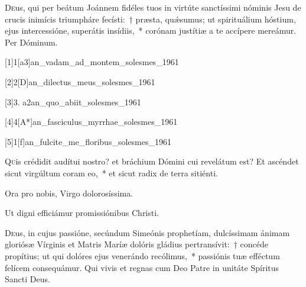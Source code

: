 \documentclass[vesperale_romanum.tex]{subfiles}
\begin{document}
\lettrine{D}{e}us, qui per beátum Joánnem fidéles tuos in virtúte san\-ctíssimi nóminis Jesu de crucis inimícis triumpháre fecísti:~† præsta, quǽsumus; ut spirituálium hóstium, ejus intercessióne, superátis insídiis,~* corónam justítiæ a te accípere mereámur. Per Dóminum.

\commferiae

\myrule

\vspace{0.25\baselineskip}


\duplexmajus


[1]{1}[a3]{an_vadam_ad_montem_solesmes_1961}

[2]{2}[D]{an_dilectus_meus_solesmes_1961}

[3]{3. a2}{an_quo_abiit_solesmes_1961}

[4]{4}[A*]{an_fasciculus_myrrhae_solesmes_1961}

[5]{1}[f]{an_fulcite_me_floribus_solesmes_1961}


\lettrine{Q}{u}is crédidit audítui nostro? et bráchium Dómini cui revelátum est? Et ascéndet sicut virgúltum coram eo,~* et sicut radix de terra sitiénti.

\hymnus


\vv Ora pro nobis, Virgo dolorosíssima.

\rr Ut digni efficiámur promissiónibus Christi.


\oratio

\lettrine{D}{e}us, in cujus passióne, secúndum Simeónis prophetíam, dulcíssimam ánimam gloriósæ Vírginis et Matris Maríæ dolóris gládius pertransívit:~† concéde propítius; ut qui dolóres ejus venerándo recólimus,~* passiónis tuæ effé\-ctum felícem consequámur. Qui vivis et regnas cum Deo Patre in unitáte Spíritus Sancti Deus.
\end{document}
